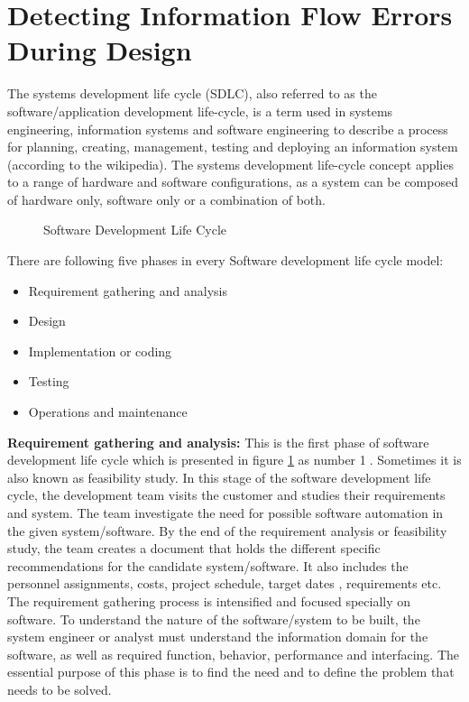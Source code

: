 \section{ Detecting Information Flow Errors During Design}

The systems development life cycle (SDLC), also referred to as the software/application development life-cycle, is a term used in systems engineering, information systems and software engineering to describe a process for planning, creating, management, testing and deploying an information system (according to the wikipedia). The systems development life-cycle concept applies to a range of hardware and software configurations, as a system can be composed of hardware only, software only or a combination of both.

\begin{figure}[htbp]
	\centering
	\caption{Software Development Life Cycle}
	\label{figure_sdlc}
\end{figure}

There are following five phases in every Software development life cycle model:

\begin{itemize}
	\item Requirement gathering and analysis
	\item Design
	\item Implementation or coding
	\item Testing
	\item Operations and maintenance 
\end{itemize}

\textbf{Requirement gathering and analysis:}
This is the first phase of software development life cycle which is presented in figure \ref{figure_sdlc} as number \textcircled{1}. Sometimes it is also known as feasibility study. In this stage of the software development life cycle, the development team visits the customer and studies their requirements and system. The team investigate the need for possible software automation in the given system/software. By the end of the requirement analysis or feasibility study, the team creates a document that holds the different specific recommendations for the candidate system/software. It also includes the personnel assignments, costs, project schedule, target dates , requirements etc. The requirement gathering process is intensified and focused specially on software. To understand the nature of the software/system to be built, the system engineer or analyst must understand the information domain for the software, as well as required function, behavior, performance and interfacing. The essential purpose of this phase is to find the need and to define the problem that needs to be solved.

